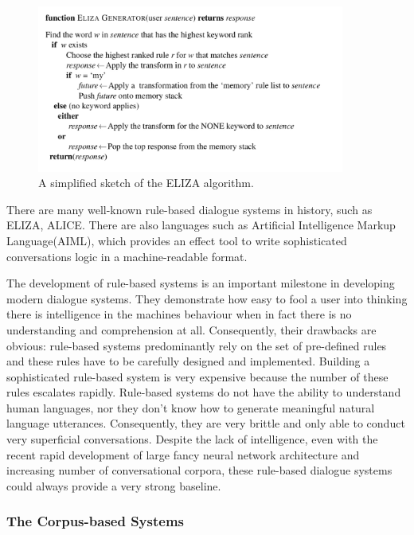 \documentclass[bsc,frontabs,twoside,singlespacing,parskip,deptreport]{infthesis}     %
\begin{document}
\begin{figure}[h]
    \centering
    \includegraphics[width=0.9\textwidth]{elizarule.jpeg}
    \caption{A simplified sketch of the ELIZA algorithm.}
    \label{fig:elizarule}
\end{figure}

There are many well-known rule-based dialogue systems in history, such as ELIZA\cite{weizenbaum1966eliza}, ALICE\cite{wallace1995artificial}. There are also languages such as Artificial Intelligence Markup Language(AIML), which provides an effect tool to write sophisticated conversations logic in a machine-readable format\cite{wallace1995artificial}.

The development of rule-based systems is an important milestone in developing modern dialogue systems. They demonstrate how easy to fool a user into thinking there is intelligence in the machines behaviour when in fact there is no understanding and comprehension at all. Consequently, their drawbacks are obvious: rule-based systems predominantly rely on the set of pre-defined rules and these rules have to be carefully designed and implemented. Building a sophisticated rule-based system is very expensive because the number of these rules escalates rapidly. Rule-based systems do not have the ability to understand human languages, nor they don't know how to generate meaningful natural language utterances\cite{jiweilithesis}. Consequently, they are very brittle and only able to conduct very superficial conversations. Despite the lack of intelligence, even with the recent rapid development of large fancy neural network architecture and increasing number of conversational corpora, these rule-based dialogue systems could always provide a very strong baseline.


\subsubsection*{The Corpus-based Systems}
\end{document}
